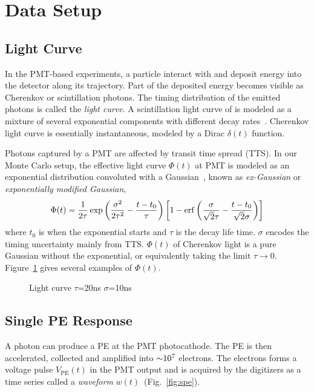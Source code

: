 \section{Data Setup} %
\label{sec:toyMC}

\subsection{Light Curve}
In the PMT-based experiments, a particle interact with and deposit energy into the detector along its trajectory. Part of the deposited energy becomes visible as Cherenkov or scintillation photons.  The timing distribution of the emitted photons is called the \textit{light curve}.  A scintillation light curve of is modeled as a mixture of several exponential components with different decay rates~\cite{ludhova_particle_2020}.  Cherenkov light curve is essentially instantaneous, modeled by a Dirac $\delta(t)$ function.

Photons captured by a PMT are affected by transit time spread (TTS).  In our Monte Carlo setup, the effective light curve $\Phi(t)$ at PMT is modeled as an exponential distribution convoluted with a Gaussian~\cite{li_separation_2016}, known as \textit{ex-Gaussian} or \textit{exponentially modified Gaussian},
\begin{align}
    \Phi(t) = \frac{1}{2\tau} \exp\left(\frac{\sigma^2}{2\tau^2}-\frac{t-t_0}{\tau}\right) \left[1 - \operatorname{erf}\left( \frac{\sigma}{\sqrt{2}\tau} - \frac{t-t_0}{\sqrt{2}\sigma} \right)\right]
    \label{eq:time-pro}
\end{align}
where $t_0$ is when the exponential starts and $\tau$ is the decay life time.  $\sigma$ encodes the timing uncertainty mainly from TTS.  $\Phi(t)$ of Cherenkov light is a pure Gaussian without the exponential, or equivalently taking the limit $\tau \rightarrow 0$.  Figure~\ref{fig:time-pro} gives several examples of $\Phi(t)$.

\begin{figure}
  \centering
  \resizebox{0.6\textwidth}{!}{}
  \caption{\label{fig:time-pro} Light curve $\tau$=20ns $\sigma$=10ns}
\end{figure}

\subsection{Single PE Response}
A photon can produce a PE at the PMT photocathode.  The PE is then accelerated, collected and amplified into $\num[retain-unity-mantissa=false]{\sim 1e7}$ electrons.  The electrons forms a voltage pulse $V_\mathrm{PE}(t)$ in the PMT output and is acquired by the digitizers as a time series called a \textit{waveform} $w(t)$~(Fig.~\ref{fig:spe}).

